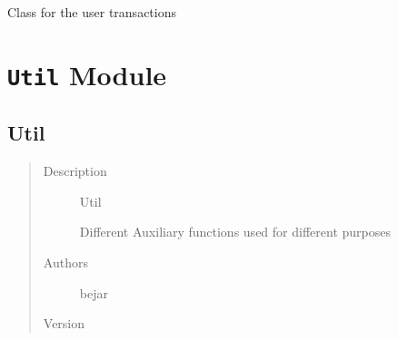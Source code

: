 \documentclass[letterpaper,10pt,english]{sphinxmanual}
\begin{document}

\begin{fulllineitems}
\label{index:SuperHub.Transactions.Transactions}
Class for the user transactions

\begin{fulllineitems}
\label{index:SuperHub.Transactions.Transactions.application}
\end{fulllineitems}


\begin{fulllineitems}
\label{index:SuperHub.Transactions.Transactions.usertrans}
\end{fulllineitems}


\begin{fulllineitems}
\label{index:SuperHub.Transactions.Transactions.wpath}
\end{fulllineitems}


\end{fulllineitems}



\chapter{\texttt{Util} Module}
\label{index:util-module}\label{index:module-SuperHub.Util}\label{index:module-Util}

\section{Util}
\label{index:util}\begin{quote}\begin{description}
\item[{Description}] \leavevmode
Util

Different Auxiliary functions used for different purposes

\item[{Authors}] \leavevmode
bejar

\item[{Version}] 

\end{description}\end{quote}
\end{document}
